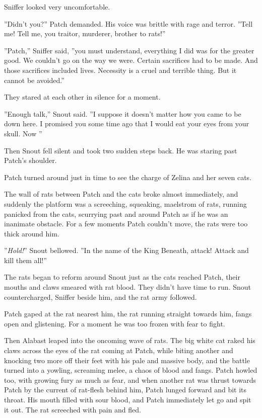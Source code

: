 \documentclass[12pt]{book}
\begin{document}
 Sniffer looked very uncomfortable.\par
 ''Didn't you?'' Patch demanded. His voice was brittle with rage and terror. ''Tell me! Tell me, you traitor, murderer, brother to rats!''\par
 ''Patch,'' Sniffer said, ''you must understand, everything I did was for the greater good. We couldn't go on the way we were. Certain sacrifices had to be made. And those sacrifices included lives. Necessity is a cruel and terrible thing. But it cannot be avoided.''\par
 They stared at each other in silence for a moment.\par
 ''Enough talk,'' Snout said. ''I suppose it doesn't matter how you came to be down here. I promised you some time ago that I would eat your eyes from your skull. Now %
''\par
 Then Snout fell silent and took two sudden steps back. He was staring past Patch's shoulder.\par
Patch turned around just in time to see the charge of Zelina and her seven cats.\par
The wall of rats between Patch and the cats broke almost immediately, and suddenly the platform was a screeching, squeaking, maelstrom of rats, running panicked from the cats, scurrying past and around Patch as if he was an inanimate obstacle. For a few moments Patch couldn't move, the rats were too thick around him.\par
 ''{\it Hold!}'' Snout bellowed. ''In the name of the King Beneath, attack! Attack and kill them all!''\par
 The rats began to reform around Snout just as the cats reached Patch, their mouths and claws smeared with rat blood. They didn't have time to run. Snout countercharged, Sniffer beside him, and the rat army followed.\par
Patch gaped at the rat nearest him, the rat running straight towards him, fangs open and glistening. For a moment he was too frozen with fear to fight.\par
 Then Alabast leaped into the oncoming wave of rats. The big white cat raked his claws across the eyes of the rat coming at Patch, while biting another and knocking two more off their feet with his pale and massive body, and the battle turned into a yowling, screaming melee, a chaos of blood and fangs. Patch howled too, with growing fury as much as fear, and when another rat was thrust towards Patch by the current of rat-flesh behind him, Patch lunged forward and bit its throat. His mouth filled with sour blood, and Patch immediately let go and spit it out. The rat screeched with pain and fled.\par
\end{document}
